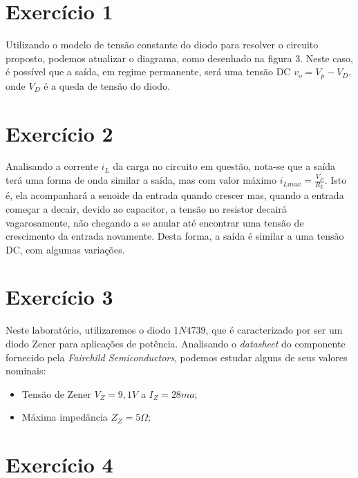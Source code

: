 \documentclass[12pt, a4paper, twoside]{article}
\begin{document}
\section{Exercício 1}


Utilizando o modelo de tensão constante do diodo para resolver o circuito proposto, podemos atualizar o diagrama, como desenhado na figura 3. Neste caso, é possível que a saída, em regime permanente, será uma tensão DC $v_o = V_p - V_D$, onde $V_D$ é a queda de tensão do diodo.

\section{Exercício 2}


Analisando a corrente $i_L$ da carga no circuito em questão, nota-se que a saída terá uma forma de onda similar a saída, mas com valor máximo $i_{Lmax} = \frac{V_P}{R_L}$. Isto é, ela acompanhará a senoide da entrada quando crescer mas, quando a entrada começar a decair, devido ao capacitor, a tensão no resistor decairá vagarosamente, não chegando a se anular até encontrar uma tensão de crescimento da entrada novamente. Desta forma, a saída é similar a uma tensão DC, com algumas variações.

\section{Exercício 3}

Neste laboratório, utilizaremos o diodo $1N4739$, que é caracterizado por ser um diodo Zener para aplicações de potência. Analisando o \textit{datasheet} do componente fornecido pela \textit{Fairchild Semiconductors}, podemos estudar alguns de seus valores nominais:

\begin{itemize}
    \item Tensão de Zener $V_Z = 9,1V$ a $I_Z = 28ma$;
    \item Máxima impedância $Z_Z = 5 \Omega$;
\end{itemize}

\section{Exercício 4}
\end{document}
